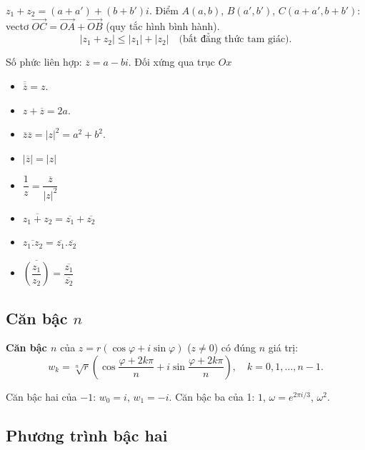 \documentclass[12pt,a4paper]{article}
\begin{document}
\begin{congthuc}[title={Tổng và bất đẳng thức tam giác}]
  $z_1 + z_2 = (a + a') + (b + b')i$. Điểm $A(a, b)$, $B(a', b')$, $C(a + a', b + b')$: vectơ $\overrightarrow{OC} = \overrightarrow{OA} + \overrightarrow{OB}$ (quy tắc hình bình hành).
  \[
    |z_1 + z_2| \le |z_1| + |z_2| \quad \text{(bất đẳng thức tam giác)}.
  \]
\end{congthuc}

\begin{dinhnghia}
  Số phức liên hợp: $\overline{z} = a - bi$. Đối xứng qua trục $Ox$
\end{dinhnghia}

\begin{tinhchat}
  \begin{itemize}
      \item $\overline{\overline{z}} = z$.
      \item $z + \overline{z} = 2a$.
      \item $\overline{z}\overline{z} = |z|^2 = a^2 + b^2$.
      \item $|\overline{z}| = |z|$
      \item $\dfrac{1}{z} = \dfrac{\overline{z}}{|z|^2}$
      \item $\overline{z_1 + z_2} = \overline{z_1} + \overline{z_2}$
      \item $\overline{z_1 . z_2} = \overline{z_1} . \overline{z_2}$
      \item $\overline{(\dfrac{z_1}{z_2})} = \dfrac{\overline{z_1}}{\overline{z_2}}$
  \end{itemize}
\end{tinhchat}

\subsection{Căn bậc $n$}

\begin{dinhnghia}
  \textbf{Căn bậc $n$} của $z = r(\cos\varphi + i\sin\varphi)$ ($z \ne 0$) có đúng $n$ giá trị:
  \[
    w_k = \sqrt[n]{r}\left(\cos\frac{\varphi + 2k\pi}{n} + i\sin\frac{\varphi + 2k\pi}{n}\right), \quad k = 0, 1, \ldots, n-1.
  \]
\end{dinhnghia}

\begin{vidu}
  Căn bậc hai của $-1$: $w_0 = i$, $w_1 = -i$. Căn bậc ba của 1: $1$, $\omega = e^{2\pi i/3}$, $\omega^2$.
\end{vidu}

\subsection{Phương trình bậc hai}
\end{document}
